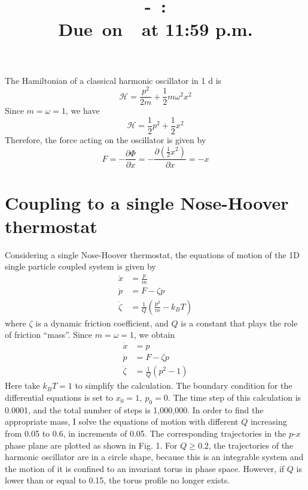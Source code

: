 \documentclass{article}
\title{
    \vspace{2in}
    \textmd{\textbf{\hmwkClassNo\ -\ \hmwkClass:\ \hmwkTitle}}\\
    \normalsize\vspace{0.1in}\small{Due\ on\ \hmwkDueDate\ at 11:59 p.m.}\\
    \vspace{0.1in}\large{\textit{\hmwkClassInstructor}}
    \vspace{3in}
}
\author{\hmwkAuthorName}
\date{}
\newcommand{\pderiv}[2]{\frac{\partial #1}{\partial #2}}
\begin{document}
\maketitle

\pagebreak

The Hamiltonian of a classical harmonic oscillator in 1 d is
\begin{equation}
    \mathcal{H} = \frac{p^2}{2m} + \frac{1}{2} m \omega^2 x^2
\end{equation}
Since $m = \omega = 1$, we have
\begin{equation}
    \mathcal{H} = \frac{1}{2} p^2 + \frac{1}{2} x^2
\end{equation}
Therefore, the force acting on the oscillator is given by
\begin{equation}
    F = - \pderiv{\varPhi}{x} = - \pderiv{\left(\frac{1}{2}x^2\right)}{x} = -x
\end{equation}

\section{Coupling to a single Nose-Hoover thermostat}
Considering a single Nose-Hoover thermostat, the equations of motion of the 1D single particle coupled system is given by
\begin{equation}
    \begin{aligned}
        \dot{x} & = \frac{p}{m} \\
        \dot{p} & = F-\zeta p \\
        \dot{\zeta} & =\frac{1}{Q}\left(\frac{p^2}{m}-k_B T\right)
    \end{aligned}
\end{equation}
where $\zeta$ is a dynamic friction coefficient, and $Q$ is a constant that plays the role of friction ``mass''. Since $m = \omega = 1$, we obtain
\begin{equation}
    \begin{aligned}
        \dot{x} & = p \\
        \dot{p} & = F-\zeta p \\
        \dot{\zeta} & =\frac{1}{Q}\left(p^2 - 1\right)
    \end{aligned}
\end{equation}
Here take $k_B T = 1$ to simplify the calculation. The boundary condition for the differential equations is set to $x_0 = 1,\ p_0 = 0$. The time step of this calculation is 0.0001, and the total number of steps is 1,000,000. In order to find the appropriate mass, I solve the equations of motion with different $Q$ increasing from 0.05 to 0.6, in increments of 0.05. The corresponding trajectories in the $p$-$x$ phase plane are plotted as shown in Fig. 1. For $Q \geq 0.2$, the trajectories of the harmonic oscillator are in a circle shape, because this is an integrable system and the motion of it is confined to an invariant torus in phase space. However, if $Q$ is lower than or equal to 0.15, the torus profile no longer exists. 
\end{document}
